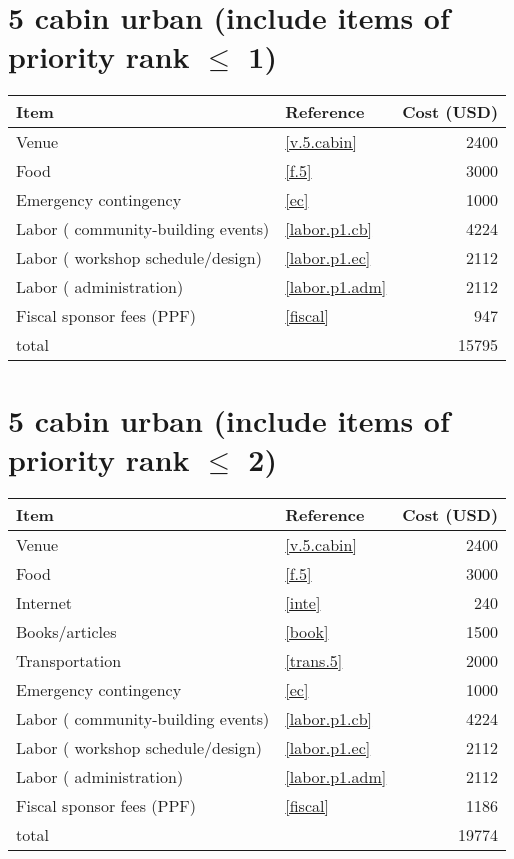 \section*{5 cabin urban (include items of priority rank $\leq$ 1)}
\begin{center}
\begin{tabular}{llr}
Item & Reference & Cost (USD) \\ \hline
Venue & \ref{v.5.cabin} & 2400 \\
Food & \ref{f.5} & 3000 \\
Emergency contingency & \ref{ec} & 1000 \\
Labor ( community-building events) & \ref{labor.p1.cb} & 4224 \\
Labor ( workshop schedule/design) & \ref{labor.p1.ec} & 2112 \\
Labor ( administration) & \ref{labor.p1.adm} & 2112 \\
Fiscal sponsor fees (PPF) & \ref{fiscal} & 947 \\ \hline
total &  & 15795
\end{tabular}
\end{center}
\newpage
\section*{5 cabin urban (include items of priority rank $\leq$ 2)}
\begin{center}
\begin{tabular}{llr}
Item & Reference & Cost (USD) \\ \hline
Venue & \ref{v.5.cabin} & 2400 \\
Food & \ref{f.5} & 3000 \\
Internet & \ref{inte} & 240 \\
Books/articles & \ref{book} & 1500 \\
Transportation & \ref{trans.5} & 2000 \\
Emergency contingency & \ref{ec} & 1000 \\
Labor ( community-building events) & \ref{labor.p1.cb} & 4224 \\
Labor ( workshop schedule/design) & \ref{labor.p1.ec} & 2112 \\
Labor ( administration) & \ref{labor.p1.adm} & 2112 \\
Fiscal sponsor fees (PPF) & \ref{fiscal} & 1186 \\ \hline
total &  & 19774
\end{tabular}
\end{center}
\newpage
